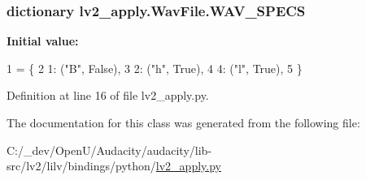 \subsubsection[{\texorpdfstring{W\+A\+V\+\_\+\+S\+P\+E\+CS}{WAV_SPECS}}]{\setlength{\rightskip}{0pt plus 5cm}dictionary lv2\+\_\+apply.\+Wav\+File.\+W\+A\+V\+\_\+\+S\+P\+E\+CS\hspace{0.3cm}{\ttfamily [static]}}\hypertarget{classlv2__apply_1_1_wav_file_af87261f02216eedeb398d83f4344a0ca}{}\label{classlv2__apply_1_1_wav_file_af87261f02216eedeb398d83f4344a0ca}
{\bfseries Initial value\+:}
\begin{DoxyCode}
1 = \{
2         1: (\textcolor{stringliteral}{"B"}, \textcolor{keyword}{False}),
3         2: (\textcolor{stringliteral}{"h"}, \textcolor{keyword}{True}),
4         4: (\textcolor{stringliteral}{"l"}, \textcolor{keyword}{True}),
5     \}
\end{DoxyCode}


Definition at line 16 of file lv2\+\_\+apply.\+py.



The documentation for this class was generated from the following file\+:\begin{DoxyCompactItemize}
\item 
C\+:/\+\_\+dev/\+Open\+U/\+Audacity/audacity/lib-\/src/lv2/lilv/bindings/python/\hyperlink{lv2__apply_8py}{lv2\+\_\+apply.\+py}\end{DoxyCompactItemize}
